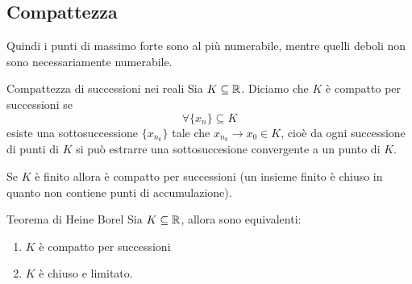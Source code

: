 \documentclass[a4paper]{article}
\begin{document}
\subsection{Compattezza}

Quindi i punti di massimo forte sono al più numerabile,
mentre quelli deboli non sono necessariamente numerabile.

\begin{snippetdefinition}{Compattezza di successioni nei reali}
    Sia \(K \subseteq \mathbb{R}\). Diciamo che \(K\)
    è compatto per successioni se
    \[
        \forall \{x_n\} \subseteq K
    \]
    esiste una sottosuccessione \(\{x_{n_k}\}\) tale che \(x_{n_k} \to x_0 \in K\),
    cioè da ogni successione di punti di \(K\) si può estrarre una sottosuccesione convergente
    a un punto di \(K\).
\end{snippetdefinition}

Se \(K\) è finito allora è compatto per successioni (un insieme finito è chiuso in quanto
non contiene punti di accumulazione).

\begin{snippettheorem}{Teorema di Heine Borel}
    Sia \(K \subseteq \mathbb{R}\), allora sono equivalenti:
    \begin{enumerate}
        \item \(K\) è compatto per successioni
        \item \(K\) è chiuso e limitato.
    \end{enumerate}
\end{snippettheorem}
\end{document}
